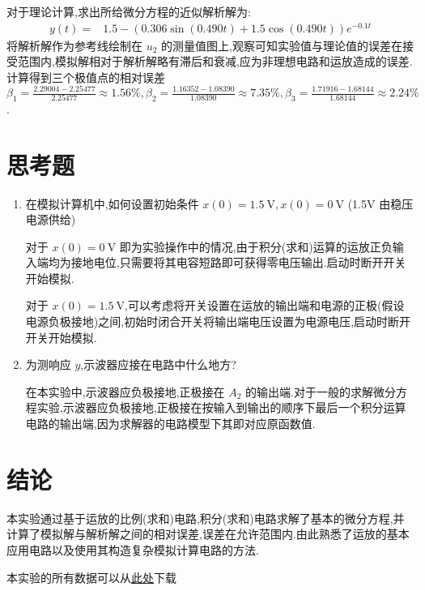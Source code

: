     对于理论计算,求出所给微分方程的近似解析解为:
    \begin{align}
        y\left( t \right) =&1.5-\left( 0.306\sin\left( 0.490t \right) +1.5\cos\left( 0.490t \right)  \right)e^{-0.1t}\nonumber
    \end{align}
    将解析解作为参考线绘制在 $u_2$ 的测量值图上,观察可知实验值与理论值的误差在接受范围内,模拟解相对于解析解略有滞后和衰减,应为非理想电路和运放造成的误差.计算得到三个极值点的相对误差 $\beta_1=\frac{2.29004-2.25477}{2.25477}\approx 1.56\%,\beta_2=\frac{1.16352-1.08390}{1.08390}\approx 7.35\%,\beta_3=\frac{1.71916-1.68144}{1.68144}\approx 2.24\%$.
    \begin{figure}[htbp]
        \centering
    \end{figure}
    \newpage
    \section{思考题}
    \begin{enumerate}
        \item 在模拟计算机中,如何设置初始条件 $x\left( 0 \right) =1.5 \ \mathrm{V},x\left( 0 \right) =0 \ \mathrm{V}$ (1.5V 由稳压电源供给)

            对于 $x\left( 0 \right) =0 \ \mathrm{V}$ 即为实验操作中的情况,由于积分(求和)运算的运放正负输入端均为接地电位,只需要将其电容短路即可获得零电压输出.启动时断开开关开始模拟.

            对于 $x\left( 0 \right) =1.5 \ \mathrm{V}$,可以考虑将开关设置在运放的输出端和电源的正极(假设电源负极接地)之间,初始时闭合开关将输出端电压设置为电源电压,启动时断开开关开始模拟.
        \item 为测响应 $y$,示波器应接在电路中什么地方?

            在本实验中,示波器应负极接地,正极接在 $A_2$ 的输出端.对于一般的求解微分方程实验,示波器应负极接地,正极接在按输入到输出的顺序下最后一个积分运算电路的输出端,因为求解器的电路模型下其即对应原函数值.
    \end{enumerate}
    \section{结论}
    本实验通过基于运放的比例(求和)电路,积分(求和)电路求解了基本的微分方程,并计算了模拟解与解析解之间的相对误差,误差在允许范围内.由此熟悉了运放的基本应用电路以及使用其构造复杂模拟计算电路的方法.

    本实验的所有数据可以从\href{https://cloud.tsinghua.edu.cn/d/52923f32fd6542eca8ac/}{此处}下载

